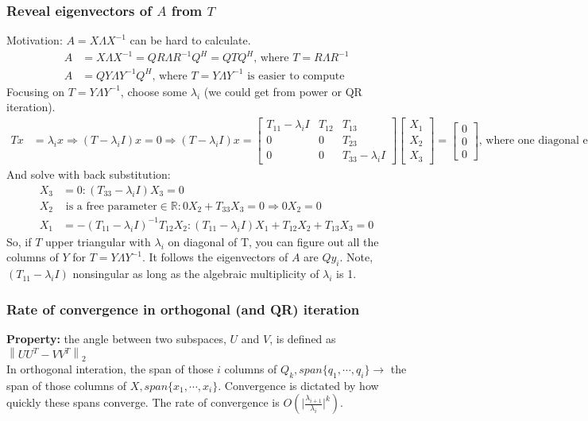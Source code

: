 \documentclass{article}
\newcommand{\norm}[2]{\left\lVert#1\right\rVert_#2}
\newcommand{\abs}[1]{\lvert#1\rvert}
\begin{document}
\subsubsection{Reveal eigenvectors of $A$ from $T$}
Motivation: $A = X\Lambda X^{-1}$ can be hard to calculate.
\begin{align*}
    A &= X\Lambda X^{-1} = QR \Lambda R^{-1}Q^H = QTQ^H \textrm{, where } T = R\Lambda R^{-1}\\
    A &= QY\Lambda Y^{-1}Q^H \textrm{, where $T = Y \Lambda Y^{-1}$ is easier to compute}
\end{align*}
Focusing on $T = Y \Lambda Y^{-1}$, choose some $\lambda_i$ (we could get from power or QR iteration). 
\begin{align*}
    Tx &= \lambda_i x \Longrightarrow (T - \lambda_i I)x = 0 \Longrightarrow  (T - \lambda_i I)x  = \begin{bmatrix} T_{11} - \lambda_i I & T_{12} & T_{13}\\ 0 & 0 & T_{23}\\
            0 & 0 & T_{33} - \lambda_i I \end{bmatrix} \begin{bmatrix} X_1 \\ X_2 \\ X_3 \end{bmatrix} = \begin{bmatrix} 0 \\ 0 \\ 0 \end{bmatrix} \textrm{, where one diagonal element is 0}
\end{align*}
And solve with back substitution:
\begin{align*}
    X_3 &= 0: (T_{33} - \lambda_i I) X_3 = 0\\
    X_2 &\textrm{ is a free parameter} \in \mathbb{R}: 0X_2 + T_{33}X_3 = 0 \Longrightarrow 0X_2 = 0\\
    X_1 &= -(T_{11}-\lambda_i I)^{-1}T_{12}X_2: (T_{11}-\lambda_i I)X_1 + T_{12}X_2 + T_{13}X_3 = 0
\end{align*}
So, if $T$ upper triangular with $\lambda_i$ on diagonal of T, you can figure out all the columns of $Y$ for $T = Y\Lambda Y^{-1}$. It follows the eigenvectors of $A$ are $Qy_i$. Note, $(T_{11} - \lambda_i I)$ nonsingular as long as the algebraic multiplicity of $\lambda_i$ is 1.

\subsubsection{Rate of convergence in orthogonal (and QR) iteration}
\textbf{Property:} the angle between two subspaces, $U$ and $V$, is defined as $\norm{UU^T - VV^T}{2}$\\
\noindent In orthogonal interation, the span of those $i$ columns of $Q_k, span\{q_1, \cdots, q_i\} \longrightarrow$ the span of those columns of $X, span \{x_1, \cdots, x_i\}$. Convergence is dictated by how quickly these spans converge. The rate of convergence is $O(\abs{\frac{\lambda_{i+1}}{\lambda_i}}^k)$.
\end{document}
